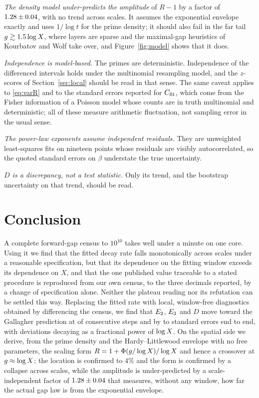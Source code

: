 \documentclass[11pt,a4paper]{article}
\begin{document}
\emph{The density model under-predicts the amplitude} of $R-1$ by a factor of $1.28\pm0.04$, with no trend across scales. It assumes the exponential envelope exactly and uses $1/\log t$ for the prime density; it should also fail in the far tail $g\gtrsim1.5\log X$, where layers are sparse and the maximal-gap heuristics of Kourbatov and Wolf \cite{KourbatovWolf2019} take over, and Figure~\ref{fig:model} shows that it does.

\emph{Independence is model-based.} The primes are deterministic. Independence of the differenced intervals holds under the multinomial resampling model, and the $z$-scores of Section~\ref{sec:local} should be read in that sense. The same caveat applies to \eqref{eq:varR} and to the standard errors reported for $C_{\mathrm{fit}}$, which come from the Fisher information of a Poisson model whose counts are in truth multinomial and deterministic; all of these measure arithmetic fluctuation, not sampling error in the usual sense.

\emph{The power-law exponents assume independent residuals.} They are unweighted least-squares fits on nineteen points whose residuals are visibly autocorrelated, so the quoted standard errors on $\beta$ understate the true uncertainty.

\emph{$D$ is a discrepancy, not a test statistic.} Only its trend, and the bootstrap uncertainty on that trend, should be read.

\section{Conclusion}

A complete forward-gap census to $10^{10}$ takes well under a minute on one core. Using it we find that the fitted decay rate falls monotonically across \nScales{} scales under a reasonable specification, but that its dependence on the fitting window exceeds its dependence on $X$, and that the one published value traceable to a stated procedure is reproduced from our own census, to the three decimals reported, by a change of specification alone. Neither the plateau reading nor its refutation can be settled this way. Replacing the fitted rate with local, window-free diagnostics obtained by differencing the census, we find that $E_2$, $E_3$ and $D$ move toward the Gallagher prediction at \towardEtwo{} of \nSteps{} consecutive steps and by \zDEnd{} to \zEtwoEnd{} standard errors end to end, with deviations decaying as a fractional power of $\log X$. On the spatial side we derive, from the prime density and the Hardy--Littlewood envelope with no free parameters, the scaling form $R=1+\Phi(g/\log X)/\log X$ and hence a crossover at $g\approx\log X$; the location is confirmed to $4\%$ and the form is confirmed by a collapse across \nScales{} scales, while the amplitude is under-predicted by a scale-independent factor of $1.28\pm0.04$ that measures, without any window, how far the actual gap law is from the exponential envelope.
\end{document}
